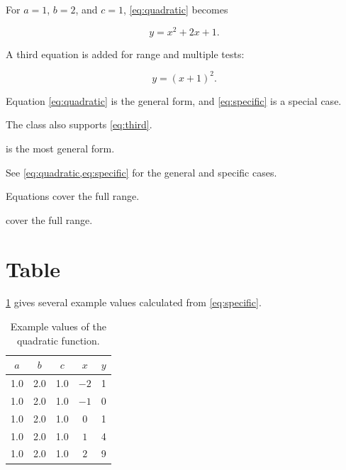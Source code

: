 \documentclass[11pt]{../class/journalpaper}
\begin{document}
For $a=1$, $b=2$, and $c=1$, \cref{eq:quadratic} becomes

\begin{equation}
    y = x^2 + 2x + 1.
    \label{eq:specific}
\end{equation}

A third equation is added for range and multiple tests:

\begin{equation}
    y = (x+1)^2.
    \label{eq:third}
\end{equation}

Equation \cref{eq:quadratic} is the general form, and
\cref{eq:specific} is a special case.

The class also supports \cref{eq:third}.

 is the most general form.

See \cref{eq:quadratic,eq:specific} for the general and
specific cases.

Equations  cover the full
range.

 cover the full range.



\section{Table}

\cref{tab:example} gives several example values calculated
from \eqref{eq:specific}.

\begin{table}[htbp]
    \centering

    \caption{Example values of the quadratic function.}
    \label{tab:example}

    \begin{tabular}{ccccc}
        \toprule
        $a$ & $b$ & $c$ & $x$ & $y$ \\
        \midrule
        1.0 & 2.0 & 1.0 & $-2$ & 1 \\
        1.0 & 2.0 & 1.0 & $-1$ & 0 \\
        1.0 & 2.0 & 1.0 & $0$  & 1 \\
        1.0 & 2.0 & 1.0 & $1$  & 4 \\
        1.0 & 2.0 & 1.0 & $2$  & 9 \\
        \bottomrule
    \end{tabular}
\end{table}
\end{document}
